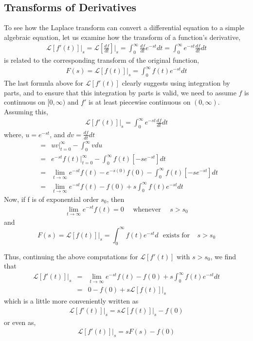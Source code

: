 \documentclass[11pt]{report}
\newcommand{\Laplace}{\mathcal{L}}
\newcommand{\sps}{\\[0.2cm]}
\newcommand{\dsp}{\displaystyle}
\newcommand{\NI}{\noindent}
\begin{document}
	\subsection{Transforms of Derivatives}
	To see how the Laplace transform can convert a differential equation to a simple algebraic equation, let us examine how the transform of a function’s derivative,
	\begin{eqnarray}
		\Laplace [f'(t)]|_{s} = \Laplace \left[\frac{df}{dt}\right]\Bigg|_{s} = \int_{0}^{\infty} \frac{df}{dt} e^{-st}dt = \int_{0}^{\infty} e^{-st} \frac{df}{dt} dt
	\end{eqnarray}
	is related to the corresponding transform of the original function,
	\begin{eqnarray}
		F(s) = \mathcal{L} [f(t)]|_{s} =\int_{0}^{\infty} f(t)e^{-st} dt
	\end{eqnarray}
	The last formula above for $\mathcal{L} [f'(t)]$ clearly suggests using integration by parts, and to ensure
	that this integration by parts is valid, we need to assume $f$ is continuous on $[0,\infty)$ and $f'$ is at least piecewise continuous on $(0,\infty)$. Assuming this,
	\begin{eqnarray}
		\mathcal{L} [f'(t)]\Big|_{s} = \int_{0}^{\infty} e^{-st} \frac{df}{dt} dt
	\end{eqnarray}
	where, $u = e^{-st}$, and $\dsp dv = \frac{df}{dt} dt$
	\begin{eqnarray*}
		&=& uv\Big|_{t = 0}^{\infty} - \int_{0}^{\infty} vdu\sps
		&=& e^{-st} f(t)\Big|_{t=0}^{\infty} - \int_{0}^{\infty} f(t)[-se^{-st}]dt\sps
		&=& \lim_{t \to \infty} e^{-st} f(t) - e^{-s(0)}f(0) - \int_{0}^{\infty} f(t)[-se^{-st}]dt\sps
		&=& \lim_{t \to \infty} e^{-st} f(t) - f(0) + s \int_{0}^{\infty} f(t)e^{-st}dt
	\end{eqnarray*}
	Now, if f is of exponential order $s_0$, then
	\begin{eqnarray*}
		\lim_{t \to \infty} e^{-st} f(t) = 0~~~~~~		\text{whenever} ~~~~~~ s>s_0
	\end{eqnarray*}
	and
	\begin{equation*}
		 F(s) = \mathcal{L}[f(t)]\Big|_s= \int_{0}^{\infty} f(t)e^{-st}d ~~~\text{exists for} ~~~~~ s>s_0
	\end{equation*}
	
	\NI Thus, continuing the above computations for $\mathcal{L}[f'(t)]$ with $s>s_0$, we find that
	\begin{eqnarray*}
		\mathcal{L}[f'(t)]|_s &=& \lim_{t \to \infty} e^{-st} f(t) - f(0) + s\int_{0}^{\infty} f(t)e^{-st}dt\sps
		&=& 0 - f(0) + s\mathcal{L}[f(t)]|_s
	\end{eqnarray*}
	which is a little more conveniently written as
	\begin{eqnarray*}
		\mathcal{L}[f'(t)]\Big|_s = s\mathcal{L}[f(t)]|_s - f(0)
	\end{eqnarray*}
	or even as,
	\begin{eqnarray*}
		\mathcal{L}[f'(t)]\Big|_s = sF(s) - f(0)
	\end{eqnarray*}
	
\end{document}
